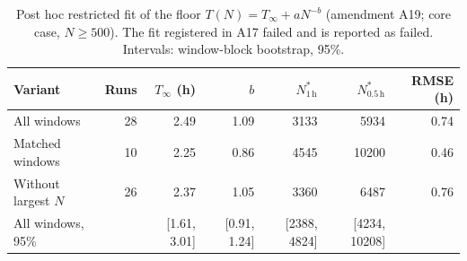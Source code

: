 \begin{table}[!t]
\centering
\footnotesize
\renewcommand{\arraystretch}{1.2}
\caption{Post hoc restricted fit of the floor $T(N)=T_\infty+aN^{-b}$ (amendment A19; core case, $N\geq500$). The fit registered in A17 failed and is reported as failed. Intervals: window-block bootstrap, 95\%.}
\label{tab:a19fit}
\begin{tabular}{|l|r|r|r|r|r|r|}
\hline
Variant & Runs & $T_\infty$ (h) & $b$ & $N^*_{1\,\mathrm{h}}$ & $N^*_{0.5\,\mathrm{h}}$ & RMSE (h) \\
\hline
All windows & 28 & 2.49 & 1.09 & 3133 & 5934 & 0.74 \\
\hline
Matched windows & 10 & 2.25 & 0.86 & 4545 & 10200 & 0.46 \\
\hline
Without largest $N$ & 26 & 2.37 & 1.05 & 3360 & 6487 & 0.76 \\
\hline
All windows, 95\% & & [1.61, 3.01] & [0.91, 1.24] & [2388, 4824] & [4234, 10208] & \\
\hline
\end{tabular}
\end{table}
